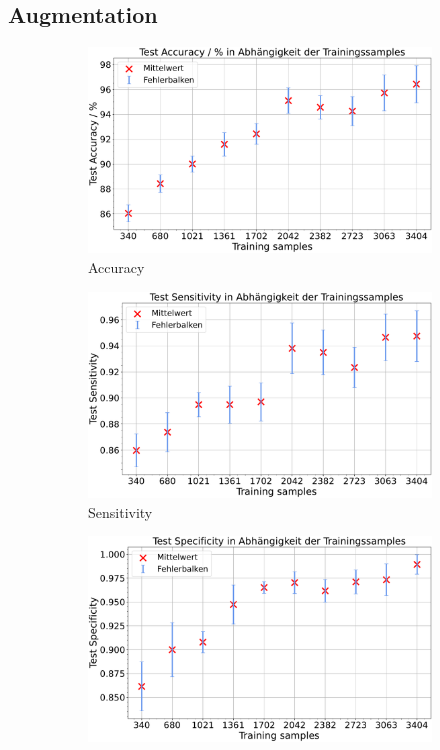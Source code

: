 \subsection{Augmentation}

\begin{figure}[H]
  \centering
  \begin{subfigure}[b]{0.48\textwidth}
    \includegraphics[width=\textwidth]{plots/Augm-Messungen-noTu-Tu_Accuracy_mean.pdf}
    \caption{Accuracy}
    \label{fig:augmentation_accuracy}
  \end{subfigure}
  \begin{subfigure}[b]{0.48\textwidth}
    \includegraphics[width=\textwidth]{plots/Augm-Messungen-noTu-Tu_Sensitivity_mean.pdf}
    \caption{Sensitivity}
    \label{fig:augmentation_sensitivity}
  \end{subfigure}
  \begin{subfigure}[b]{0.48\textwidth}
    \includegraphics[width=\textwidth]{plots/Augm-Messungen-noTu-Tu_Specificity_mean.pdf}

\end{subfigure}
\end{figure}
